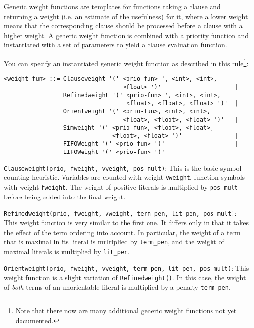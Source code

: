 \documentclass{article}
\begin{document}
Generic weight functions are templates for functions taking a clause
and returning a weight (i.e. an estimate of the usefulness) for it,
where a lower weight means that the corresponding clause should be
processed before a clause with a higher weight.  A generic weight
function is combined with a priority function and instantiated with a
set of parameters to yield a clause evaluation function.

You can specify an instantiated generic weight function as described
in this rule\footnote{Note that there now are many additional generic
  weight functions not yet documented.}:

\small
\begin{verbatim}
<weight-fun> ::= Clauseweight '(' <prio-fun> ', <int>, <int>,
                                  <float> ')'                    ||
                 Refinedweight '(' <prio-fun> ', <int>, <int>,
                                   <float>, <float>, <float> ')' ||
                 Orientweight '(' <prio-fun>, <int>, <int>,       
                                  <float>, <float>, <float> ')'  ||
                 Simweight '(' <prio-fun>, <float>, <float>,        
                               <float>, <float> ')'              ||
                 FIFOWeight '(' <prio-fun> ')'                   ||
                 LIFOWeight '(' <prio-fun> ')'
\end{verbatim}
\normalsize

\medskip
\noindent{}\texttt{Clauseweight(prio, fweight, vweight, pos\_mult)}:
This is the basic symbol counting heuristic. Variables are counted
with weight \texttt{vweight}, function symbols with weight
\texttt{fweight}. The weight of positive literals is multiplied by
\texttt{pos\_mult} before being added into the final weight.

\medskip
\begin{sloppypar}
\noindent{}\texttt{Refinedweight(prio, fweight, vweight,
    term\_pen, lit\_pen, pos\_mult)}: 
This weight function is very similar to the first one. It differs only
in that it takes the effect of the term ordering into account. In
particular, the weight of a term that is maximal in its literal is
multiplied by \texttt{term\_pen}, and the weight of maximal
literals is multiplied by \texttt{lit\_pen}.
\end{sloppypar}

\medskip
\begin{sloppypar}
\noindent{}\texttt{Orientweight(prio, fweight, vweight,
    term\_pen, lit\_pen, pos\_mult)}: This weight function is a
slight variation of \texttt{Refinedweight()}. In this case, the weight
of \emph{both} terms of an unorientable literal is multiplied by a
penalty \texttt{term\_pen}.
\end{sloppypar}
\end{document}
